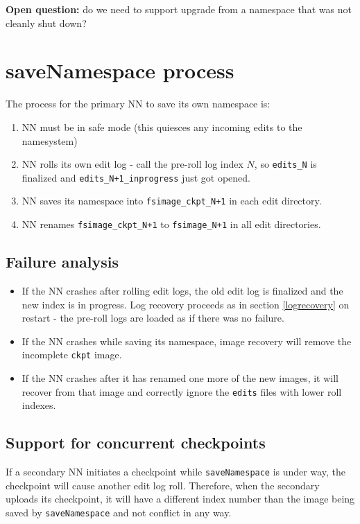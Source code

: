 \documentclass{article}
\begin{document}
{\bf Open question:} do we need to support upgrade from a namespace that was not cleanly shut down?

\section{saveNamespace process}

The process for the primary NN to save its own namespace is:

\begin{enumerate}
\item NN must be in safe mode (this quiesces any incoming edits to the namesystem)
\item NN rolls its own edit log - call the pre-roll log index $N$, so {\tt edits\_N} is finalized and {\tt edits\_N+1\_inprogress} just got opened.
\item NN saves its namespace into {\tt fsimage\_ckpt\_N+1} in each edit directory.
\item NN renames {\tt fsimage\_ckpt\_N+1} to {\tt fsimage\_N+1} in all edit directories.
\end{enumerate}

\subsection{Failure analysis}

\begin{itemize}
\item If the NN crashes after rolling edit logs, the old edit log is finalized and the new index is in progress. Log recovery proceeds as in section \ref{logrecovery} on restart - the pre-roll logs are loaded as if there was no failure.
\item If the NN crashes while saving its namespace, image recovery will remove the incomplete {\tt ckpt} image.
\item If the NN crashes after it has renamed one more of the new images, it will recover from that image and correctly ignore the {\tt edits} files with lower roll indexes.
\end{itemize}

\subsection{Support for concurrent checkpoints}

If a secondary NN initiates a checkpoint while {\tt saveNamespace} is under way, the checkpoint will cause another edit log roll. Therefore, when the secondary uploads its checkpoint, it will have a different index number than the image being saved by {\tt saveNamespace} and not conflict in any way.
\end{document}
